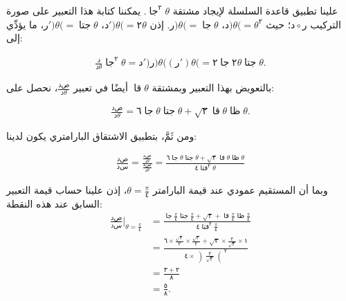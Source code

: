 \documentclass{article}
\DeclareMathOperator{\arSin}{\text{جا}}
\DeclareMathOperator{\arCos}{\text{جتا}}
\DeclareMathOperator{\arTan}{\text{قا}}
\DeclareMathOperator{\arCot}{\text{قتا}}
\DeclareMathOperator{\arSec}{\text{ظا}}
\begin{document}
علينا تطبيق قاعدة السلسلة لإيجاد مشتقة $\arSin^٢ 𝜃$. يمكننا كتابة هذا التعبير على صورة التركيب $د∘𞸓$؛ حيث $د)𝜃(=𝜃^٢$، $𞸓)𝜃(=\arSin 𝜃$. إذن $د')𝜃(=٢𝜃$، $𞸓')𝜃(=\arCos 𝜃$، ما يؤدِّي إلى:

\begin{align}
\frac{𞸃}{𞸃𝜃}\arSin^٢ 𝜃 = د')𞸓)𝜃((𞸓')𝜃(= ٢\arSin ٢𝜃 \arCos 𝜃.
\end{align}

بالتعويض بهذا التعبير وبمشتقة $\arTan 𝜃$ أيضًا في تعبير $\frac{𞸃𞸑}{𞸃𝜃}$، نحصل على:

\begin{align}
\frac{𞸃𞸑}{𞸃𝜃} = ٦\arSin 𝜃 \arCos 𝜃 + \sqrt ٢ \arTan 𝜃 \arSec 𝜃.
\end{align}

ومن ثَمَّ، بتطبيق الاشتقاق البارامتري يكون لدينا:

\begin{align}
\frac{𞸃𞸑}{𞸃𞸎} = \frac{\frac{𞸃𞸑}{𞸃𝜃}}{\frac{𞸃𞸎}{𞸃𝜃}} = \frac{٦\arSin 𝜃 \arCos 𝜃 + \sqrt{٢}\arTan 𝜃 \arSec 𝜃}{٤\arCot^٢𝜃}
\end{align}

وبما أن المستقيم عمودي عند قيمة البارامتر $𝜃=\frac{𝜋}{٤}$، إذن علينا حساب قيمة التعبير السابق عند هذه النقطة:
\begin{align}
 \frac{𞸃𞸑}{𞸃𞸎}\Big|_{𝜃=\frac{𝜋}{٤}}	&	= \frac{\arSin \frac{𝜋}{٤} \arCos\frac{𝜋}{٤} + \sqrt{٢} + \arTan\frac{𝜋}{٤}\arSec\frac{𝜋}{٤}}{٤\arCot^٢\frac{𝜋}{٤}}	\\
								&	= \frac{٦ × \frac{\sqrt ٢}{٢} × \frac{\sqrt ٢}{٢} + \sqrt ٢ × \frac ٢ {\sqrt ٢} × ١}{٤ × \left)\frac ٢{\sqrt ٢}\right(^٢}	\\
								&	= \frac{٣+٢}{٨} \\
								&	= \frac ٥ ٨.
\end{align}
\end{document}
